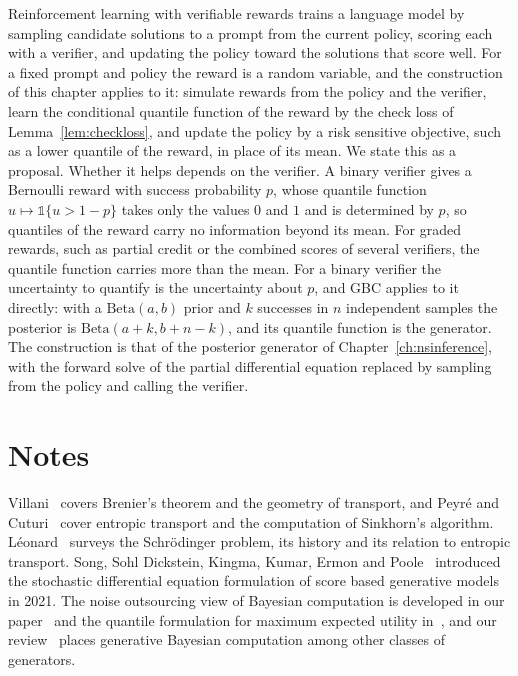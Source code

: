 Reinforcement learning with verifiable rewards trains a language model by sampling candidate solutions to a prompt from the current policy, scoring each with a verifier, and updating the policy toward the solutions that score well. For a fixed prompt and policy the reward is a random variable, and the construction of this chapter applies to it: simulate rewards from the policy and the verifier, learn the conditional quantile function of the reward by the check loss of Lemma~\ref{lem:checkloss}, and update the policy by a risk sensitive objective, such as a lower quantile of the reward, in place of its mean. We state this as a proposal. Whether it helps depends on the verifier. A binary verifier gives a Bernoulli reward with success probability $p$, whose quantile function $u\mapsto\mathbb{1}\{u>1-p\}$ takes only the values $0$ and $1$ and is determined by $p$, so quantiles of the reward carry no information beyond its mean. For graded rewards, such as partial credit or the combined scores of several verifiers, the quantile function carries more than the mean. For a binary verifier the uncertainty to quantify is the uncertainty about $p$, and GBC applies to it directly: with a $\mathrm{Beta}(a,b)$ prior and $k$ successes in $n$ independent samples the posterior is $\mathrm{Beta}(a+k,b+n-k)$, and its quantile function is the generator. The construction is that of the posterior generator of Chapter~\ref{ch:nsinference}, with the forward solve of the partial differential equation replaced by sampling from the policy and calling the verifier.



\section*{Notes}

Villani~\cite{villani2009} covers Brenier's theorem and the geometry of transport, and Peyr\'e and Cuturi~\cite{peyrecuturi2019} cover entropic transport and the computation of Sinkhorn's algorithm. L\'eonard~\cite{leonard2014} surveys the Schr\"odinger problem, its history and its relation to entropic transport. Song, Sohl Dickstein, Kingma, Kumar, Ermon and Poole~\cite{song2021} introduced the stochastic differential equation formulation of score based generative models in 2021. The noise outsourcing view of Bayesian computation is developed in our paper~\cite{polsonsokolov2025} and the quantile formulation for maximum expected utility in~\cite{polsonruggerisokolov2024}, and our review~\cite{nareklishvili2025review} places generative Bayesian computation among other classes of generators.
